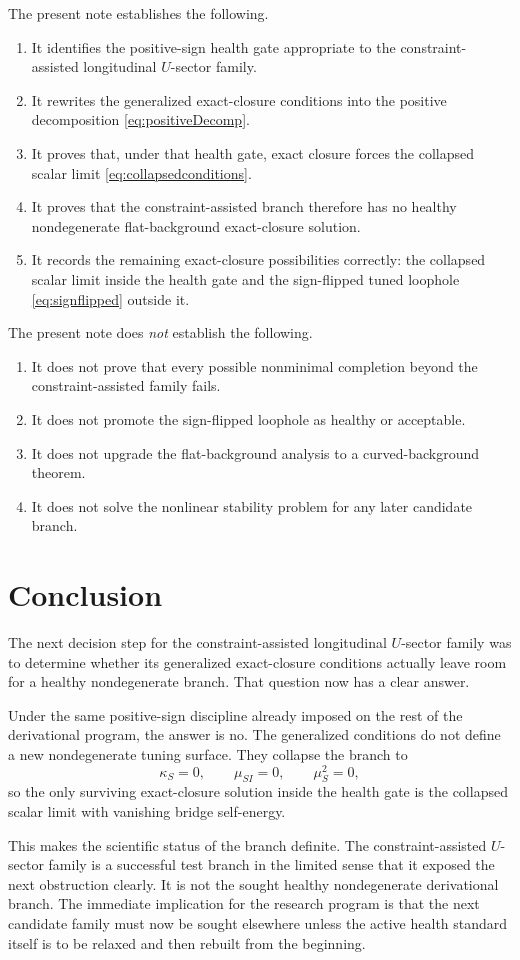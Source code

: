 \documentclass[11pt]{article}
\begin{document}
The present note establishes the following.
\begin{enumerate}
    \item It identifies the positive-sign health gate appropriate to the constraint-assisted longitudinal \(U\)-sector family.
    \item It rewrites the generalized exact-closure conditions into the positive decomposition \eqref{eq:positiveDecomp}.
    \item It proves that, under that health gate, exact closure forces the collapsed scalar limit \eqref{eq:collapsedconditions}.
    \item It proves that the constraint-assisted branch therefore has no healthy nondegenerate flat-background exact-closure solution.
    \item It records the remaining exact-closure possibilities correctly: the collapsed scalar limit inside the health gate and the sign-flipped tuned loophole \eqref{eq:signflipped} outside it.
\end{enumerate}

The present note does \emph{not} establish the following.
\begin{enumerate}
    \item It does not prove that every possible nonminimal completion beyond the constraint-assisted family fails.
    \item It does not promote the sign-flipped loophole as healthy or acceptable.
    \item It does not upgrade the flat-background analysis to a curved-background theorem.
    \item It does not solve the nonlinear stability problem for any later candidate branch.
\end{enumerate}

\section{Conclusion}

The next decision step for the constraint-assisted longitudinal \(U\)-sector family was to determine whether its generalized exact-closure conditions actually leave room for a healthy nondegenerate branch. That question now has a clear answer.

Under the same positive-sign discipline already imposed on the rest of the derivational program, the answer is no. The generalized conditions do not define a new nondegenerate tuning surface. They collapse the branch to
\[
\kappa_S=0,
\qquad
\mu_{SI}=0,
\qquad
\mu_S^2=0,
\]
so the only surviving exact-closure solution inside the health gate is the collapsed scalar limit with vanishing bridge self-energy.

This makes the scientific status of the branch definite. The constraint-assisted \(U\)-sector family is a successful test branch in the limited sense that it exposed the next obstruction clearly. It is not the sought healthy nondegenerate derivational branch. The immediate implication for the research program is that the next candidate family must now be sought elsewhere unless the active health standard itself is to be relaxed and then rebuilt from the beginning.
\end{document}
